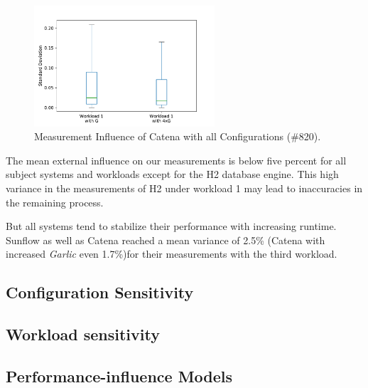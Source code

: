 \begin{figure}
  \centering
  \includegraphics[width=0.6\textwidth]{images/catena_m_infl_wl_and_wlx4_0}
  \caption{Measurement Influence of Catena with all Configurations (\#820).}
  \label{box_measure_infl_catena_x4}
\end{figure}



The mean external influence on our measurements is below five percent for all subject systems and workloads except for the H2 database engine. This high variance in the measurements of H2 under workload 1 may lead to inaccuracies in the remaining process. 

But all systems tend to stabilize their performance with increasing runtime. Sunflow as well as Catena reached a mean variance of 2.5\% (Catena with increased \textit{Garlic} even 1.7\%)for their measurements with the third workload. 



\subsection{Configuration Sensitivity}
\label{conf_sens}



\subsection{Workload sensitivity}
\label{wl_sens}

\subsection{Performance-influence Models}
\label{perf_infl_models}

